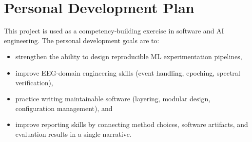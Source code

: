 \section{Personal Development Plan}
\label{sec:personal-development-plan}

This project is used as a competency-building exercise in software and AI engineering. The personal development goals are to:
\begin{itemize}
    \item strengthen the ability to design reproducible ML experimentation pipelines,
    \item improve EEG-domain engineering skills (event handling, epoching, spectral verification),
    \item practice writing maintainable software (layering, modular design, configuration management), and
    \item improve reporting skills by connecting method choices, software artifacts, and evaluation results in a single narrative.
\end{itemize}
